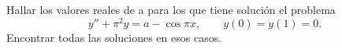Hallar los valores reales de a para los que tiene solución el problema
\[y''+\pi^2y=a-\cos\pi x,\qquad y(0)=y(1)=0.\]
Encontrar todas las soluciones en esos casos.
